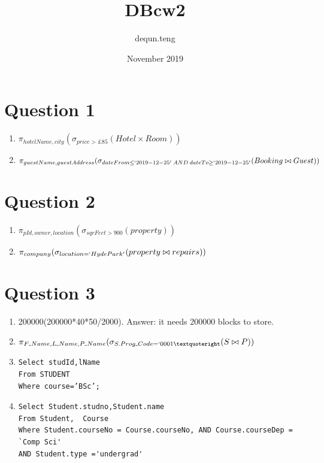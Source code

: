 \documentclass{article}
\title{DBcw2}
\author{dequn.teng }
\date{November 2019}
\begin{document}
\maketitle

\section{Question 1}
\begin{enumerate}[label=(\alph*)]
\item $\pi_{hotelName, city}(\sigma_{price > \pounds85 }(Hotel \times Room))$
\item $\pi_{guestName, guestAddress}(\sigma_{dateFrom\le `2019-12-25'\:AND\:dateTo \ge `2019-12-25'}(Booking \bowtie Guest))$

\end{enumerate}
\section{Question 2}
\begin{enumerate}[label=(\alph*)]
\item $\pi_{pId,owner,location}(\sigma_{sqrFeet>900}(property))$
\item $\pi_{company}(\sigma_{location=`Hyde Park'}(property\bowtie repairs))$


\end{enumerate}
\section{Question 3}
\begin{enumerate}[label=(\alph*)]
\item 200000(200000*40*50/2000). Answer: it needs 200000 blocks to store.
\item $\pi_{F\rule{0.1cm}{0.15mm}Name,L\rule{0.1cm}{0.15mm}Name,P\rule{0.1cm}{0.15mm}Name}( \sigma_{S.Prog\rule{0.1cm}{0.15mm}Code=`0001’}(S \bowtie P))	$

\item  
\begin{verbatim}
Select studId,lName
From STUDENT
Where course=’BSc’;
\end{verbatim}
\item 
\begin{verbatim}
Select Student.studno,Student.name
From Student,  Course 
Where Student.courseNo = Course.courseNo, AND Course.courseDep = `Comp Sci' 
AND Student.type ='undergrad' 
\end{verbatim}
\end{enumerate}
\end{document}
